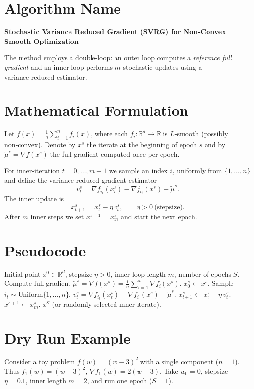 \documentclass{article}
\newcommand{\R}{\mathbb{R}}
\begin{document}
\section*{Algorithm Name}
\textbf{Stochastic Variance Reduced Gradient (SVRG) for Non‑Convex Smooth Optimization}  

The method employs a double‑loop: an outer loop computes a \emph{reference full gradient} and an inner loop performs $m$ stochastic updates using a variance‑reduced estimator.

\section*{Mathematical Formulation}
Let $f(x)=\frac{1}{n}\sum_{i=1}^{n} f_i(x)$, where each $f_i:\R^d\to\R$ is $L$‑smooth (possibly non‑convex).  
Denote by $x^{s}$ the iterate at the beginning of epoch $s$ and by $\tilde{\mu}^{s}= \nabla f(x^{s})$ the full gradient computed once per epoch.

For inner‑iteration $t=0,\dots,m-1$ we sample an index $i_t$ uniformly from $\{1,\dots,n\}$ and define the variance‑reduced gradient estimator
\[
v_t^{s}= \nabla f_{i_t}(x_t^{s})-\nabla f_{i_t}(x^{s})+\tilde{\mu}^{s}.
\]
The inner update is
\[
x_{t+1}^{s}=x_t^{s}-\eta\, v_t^{s},\qquad \eta>0\ \text{(stepsize)}.
\]
After $m$ inner steps we set $x^{s+1}=x_m^{s}$ and start the next epoch.

\section*{Pseudocode}
\begin{algorithm}[H]
\caption{SVRG (non‑convex)}\label{alg:svrg}
\begin{algorithmic}[1]
\REQUIRE Initial point $x^{0}\in\R^{d}$, stepsize $\eta>0$, inner loop length $m$, number of epochs $S$.
    \STATE Compute full gradient $\tilde{\mu}^{s}= \nabla f(x^{s})=\frac{1}{n}\sum_{i=1}^{n}\nabla f_i(x^{s})$.
    \STATE $x_{0}^{s}\gets x^{s}$.
        \STATE Sample $i_t\sim\text{Uniform}\{1,\dots,n\}$.
        \STATE $v_t^{s}= \nabla f_{i_t}(x_t^{s})-\nabla f_{i_t}(x^{s})+\tilde{\mu}^{s}$.
        \STATE $x_{t+1}^{s}\gets x_t^{s}-\eta\,v_t^{s}$.
    \ENDFOR
    \STATE $x^{s+1}\gets x_{m}^{s}$.
\ENDFOR
\RETURN $x^{S}$ (or randomly selected inner iterate).
\end{algorithmic}
\end{algorithm}

\section*{Dry Run Example}
Consider a toy problem $f(w)=(w-3)^2$ with a single component ($n=1$).  
Thus $f_1(w)= (w-3)^2$, $\nabla f_1(w)=2(w-3)$.  
Take $w_0=0$, stepsize $\eta=0.1$, inner length $m=2$, and run one epoch ($S=1$).
\end{document}
